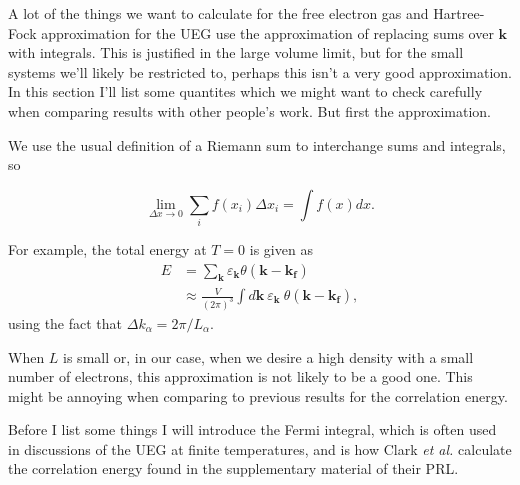 \documentclass[11pt,twosided]{article}
\begin{document}
A lot of the things we want to calculate for the free electron gas and Hartree-Fock approximation for the UEG use the approximation of replacing sums over $\mathbf{k}$ with integrals.
This is justified in the large volume limit, but for the small systems we'll likely be restricted to, perhaps this isn't a very good approximation.
In this section I'll list some quantites which we might want to check carefully when comparing results with other people's work.
But first the approximation.

We use the usual definition of a Riemann sum to interchange sums and integrals, so

\begin{equation}
    \lim_{\Delta x \rightarrow 0} \sum_i f(x_i) \Delta x_i = \int f(x) dx.
\end{equation}

For example, the total energy at $T=0$ is given as
\begin{align}
    E &= \sum_{\mathbf{k}} \varepsilon_{\mathbf{k}} \theta(\mathbf{k}-\mathbf{k_f})\\
      &\approx \frac{V}{(2\pi)^3} \int d\mathbf{k} \ \varepsilon_{\mathbf{k}} \ \theta(\mathbf{k}-\mathbf{k_f}),
\end{align}
using the fact that $\Delta k_\alpha = 2\pi/L_\alpha$.

When $L$ is small or, in our case, when we desire a high density with a small number of electrons, this approximation is not likely to be a good one.
This might be annoying when comparing to previous results for the correlation energy.

Before I list some things I will introduce the Fermi integral, which is often used in discussions of the UEG at finite temperatures, and is how Clark \emph{et al.} calculate the correlation energy found in the supplementary material of their PRL.
\end{document}
